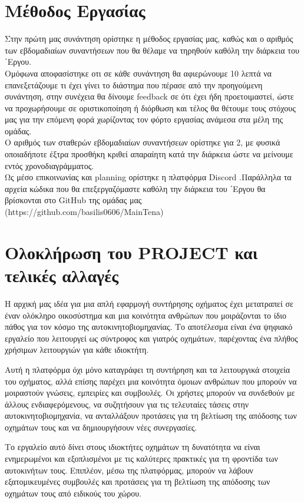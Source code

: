 \documentclass[11pt]{scrartcl} %
\begin{document}
\section{Μέθοδος Εργασίας}
Στην πρώτη μας συνάντηση ορίστηκε η μέθοδος εργασίας μας, καθώς και ο αριθμός των εβδομαδιαίων συναντήσεων που θα θέλαμε να τηρηθούν καθόλη την διάρκεια του ΄Εργου.\\
Ομόφωνα αποφασίστηκε οτι σε κάθε συνάντηση θα αφιερώνουμε 10 λεπτά να επανεξετάζουμε τι έχει γίνει το διάστημα που πέρασε από την προηγούμενη συνάντηση, στην συνέχεια θα δίνουμε feedback σε ότι έχει ήδη προετοιμαστεί, ώστε να προχωρήσουμε σε οριστικοποίηση ή διόρθωση και τέλος θα θέτουμε τους στόχους μας για την επόμενη φορά χωρίζοντας τον φόρτο εργασίας ανάμεσα στα μέλη της ομάδας. \\
Ο αριθμός των σταθερών εβδομαδιαίων συναντήσεων ορίστηκε για 2, με φυσικά οποιαδήποτε έξτρα προσθήκη κριθεί απαραίητη κατά την διάρκεια ώστε να μείνουμε εντός χρονοδιαγράμματος. \\
Ως μέσο επικοινωνίας και planning ορίστηκε η πλατφόρμα Discord .Παράλληλα τα αρχεία κώδικα που θα επεξεργαζόμαστε καθόλη την διάρκεια του ΄Εργου θα βρίσκονται στο GitHub της ομάδας μας (https://github.com/basilis0606/MainTena)

\section{Ολοκλήρωση του PROJECT και τελικές αλλαγές}
Η αρχική μας ιδέα για μια απλή εφαρμογή συντήρησης οχήματος έχει μετατραπεί σε έναν ολόκληρο οικοσύστημα και μια κοινότητα ανθρώπων που μοιράζονται το ίδιο πάθος για τον κόσμο της αυτοκινητοβιομηχανίας. Το αποτέλεσμα είναι ένα ψηφιακό εργαλείο που λειτουργεί ως σύντροφος και γιατρός οχημάτων, παρέχοντας ένα πλήθος χρήσιμων λειτουργιών για κάθε ιδιοκτήτη.

Αυτή η πλατφόρμα όχι μόνο καταγράφει τη συντήρηση και τα λειτουργικά στοιχεία του οχήματος, αλλά επίσης παρέχει μια κοινότητα όμοιων ανθρώπων που μπορούν να μοιραστούν γνώσεις, εμπειρίες και συμβουλές. Οι χρήστες μπορούν να συνδεθούν με άλλους ενδιαφερόμενους, να συζητήσουν για τις τελευταίες τάσεις στην αυτοκινητοβιομηχανία, να ανταλλάξουν προτάσεις για τη βελτίωση της απόδοσης των οχημάτων τους και να δημιουργήσουν νέες συνεργασίες.

Το εργαλείο αυτό δίνει στους ιδιοκτήτες οχημάτων τη δυνατότητα να είναι ενημερωμένοι και εξοπλισμένοι με τις καλύτερες πρακτικές για τη φροντίδα των αυτοκινήτων τους. Επιπλέον, μέσω της πλατφόρμας, μπορούν να λάβουν εξατομικευμένες συμβουλές και προτάσεις για τη βελτίωση της απόδοσης των οχημάτων τους από ειδικούς του χώρου.
\end{document}
